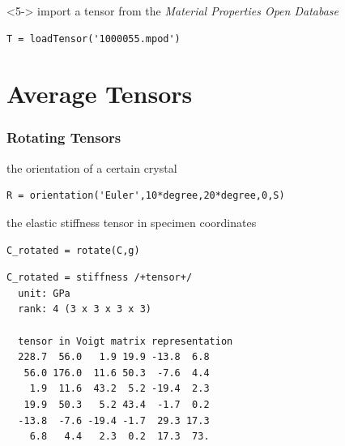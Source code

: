 \documentclass[compress]{beamer}
\begin{document}
\begin{frame}[fragile]
\begin{overlayarea}{\textwidth}{\textheight}
\bigskip

\begin{onlyenv}<5->
import a tensor from the \emph{Material Properties Open Database}

\vspace{-0.2cm}
\begin{lstlisting}[style=input]
T = loadTensor('1000055.mpod')
\end{lstlisting}

\end{onlyenv}

  \end{overlayarea}


\end{frame}




\section{Average Tensors}
\label{sec:average-tensors}

\begin{frame}[fragile]
  \frametitle{Rotating Tensors}

  the orientation of a certain crystal
  \begin{lstlisting}[style=input]
R = orientation('Euler',10*degree,20*degree,0,S)
  \end{lstlisting}

\medskip
\pause

the elastic stiffness tensor in specimen coordinates
\begin{lstlisting}[style=input]
C_rotated = rotate(C,g)
\end{lstlisting}
  \vspace{-.3cm}
\begin{lstlisting}[style=output]
C_rotated = stiffness /+tensor+/
  unit: GPa
  rank: 4 (3 x 3 x 3 x 3)

  tensor in Voigt matrix representation
  228.7  56.0   1.9 19.9 -13.8  6.8
   56.0 176.0  11.6 50.3  -7.6  4.4
    1.9  11.6  43.2  5.2 -19.4  2.3
   19.9  50.3   5.2 43.4  -1.7  0.2
  -13.8  -7.6 -19.4 -1.7  29.3 17.3
    6.8   4.4   2.3  0.2  17.3  73.
\end{lstlisting}



\end{frame}
\end{document}

